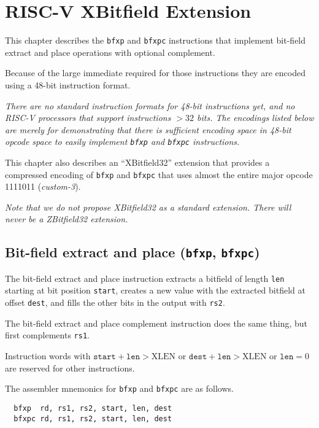 \chapter{RISC-V XBitfield Extension}
\label{bfxp}

This chapter describes the {\tt bfxp} and {\tt bfxpc} instructions that implement
bit-field extract and place operations with optional complement.

Because of the large immediate required for those instructions they are encoded
using a 48-bit instruction format.

{\it There are no standard instruction formats for 48-bit instructions yet, and
no RISC-V processors that support instructions $>32$ bits. The encodings listed
below are merely for demonstrating that there is sufficient encoding space in
48-bit opcode space to easily implement {\tt bfxp} and {\tt bfxpc}
instructions.}

This chapter also describes an ``XBitfield32'' extension that provides a compressed
encoding of {\tt bfxp} and {\tt bfxpc} that uses almost the entire major opcode
1111011 ({\it custom-3}).

{\it Note that we do not propose XBitfield32 as a standard extension. There
will never be a ZBitfield32 extension.}

\section{Bit-field extract and place ({\tt bfxp}, {\tt bfxpc})}

The bit-field extract and place instruction extracts a bitfield of length
{\tt len} starting at bit position {\tt start}, creates a new value with
the extracted bitfield at offset {\tt dest}, and fills the other bits
in the output with {\tt rs2}.

The bit-field extract and place complement instruction does the same thing,
but first complements {\tt rs1}.

Instruction words with $\texttt{start}+\texttt{len}>\textrm{XLEN}$ or
$\texttt{dest}+\texttt{len}>\textrm{XLEN}$ or $\texttt{len} = 0$ are
reserved for other instructions.



The assembler mnemonics for {\tt bfxp} and {\tt bfxpc} are as follows.

\begin{verbatim}
  bfxp  rd, rs1, rs2, start, len, dest
  bfxpc rd, rs1, rs2, start, len, dest
\end{verbatim}

